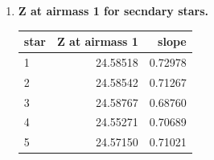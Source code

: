 \documentclass{article}
\begin{document}
\begin{enumerate}
		\item \textbf{Z at airmass 1 for secndary stars.}
		\begin{table}[h]
			\centering
			\begin{tabular} {l r r}
				\toprule
				\textbf{star} & \textbf{Z at airmass 1} & \textbf{slope} \\
				\midrule
				1 & 24.58518 & 0.72978 \\
				2 & 24.58542 & 0.71267 \\
				3 & 24.58767 & 0.68760 \\
				4 & 24.55271 & 0.70689 \\
				5 & 24.57150 & 0.71021\\
				\bottomrule
			\end{tabular}
		\end{table}
		

\end{enumerate}
\end{document}
